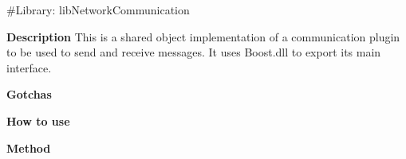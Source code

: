 \#\+Library\+: lib\+Network\+Communication

{\bfseries{Description}} This is a shared object implementation of a communication plugin to be used to send and receive messages. It uses Boost.\+dll to export its main interface.

{\bfseries{Gotchas}}

{\bfseries{How to use}}

{\bfseries{Method}} 
